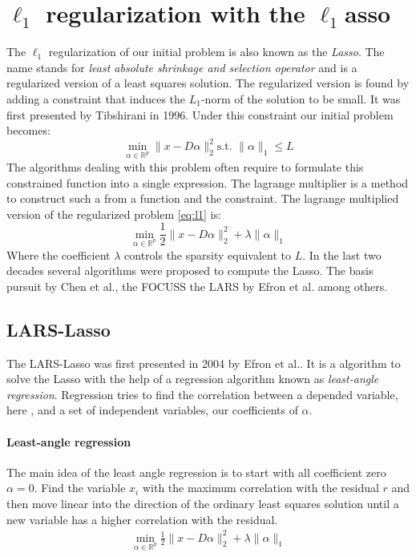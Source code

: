 \section {$\ell_1$ regularization with the $\ell_1$asso}
The $\ell_1$ regularization of our initial problem is also known as the
\emph{Lasso}. The name stands for \emph{least absolute shrinkage and
selection operator} and is a regularized version of a least squares
solution. The regularized version is found by adding a constraint that induces
the $L_1$-norm of the solution to be small. It was first presented by Tibshirani
in 1996\cite{Tibshirani1996}. Under this constraint our initial problem becomes:
\begin{equation}
\min_{\alpha\in\mathbb{R}^{p}} \lVert x - D\alpha \rVert^{2}_{2} \textrm{
s.t. } \lVert \alpha \rVert_{1} \leq L \label{eq:l1}
\end{equation}
The algorithms dealing with this problem often require to formulate this
constrained function into a single expression. The lagrange multiplier is a
method to construct such a  from a function and the constraint. The lagrange
multiplied version of the regularized problem \ref{eq:l1} is:
\begin{equation}
\min_{\alpha\in\mathbb{R}^{p}}  \frac{1}{2} \lVert x - D\alpha \rVert^{2}_{2} +
\lambda \lVert \alpha \rVert_{1}\label{eq:l1lagrange}
\end{equation}
Where the coefficient $\lambda$ controls the sparsity equivalent to $L$.
In the last two decades several algorithms were proposed to compute the
Lasso. The basis pursuit by Chen et al.\cite{Chen1995}, the FOCUSS\cite{FOCUSS}
the LARS by Efron et al.\cite{Efron2004} among others.


\subsection {LARS-Lasso}
\label{sec:lars}
The LARS-Lasso was first presented in 2004 by Efron et al.\cite{Efron2004}.
It is a algorithm to solve the Lasso with the help of a regression
algorithm known as \emph{least-angle regression}. Regression tries to find the
correlation between a depended variable, here , and a
set of independent variables, our coefficients of $\alpha$.

\paragraph{Least-angle regression}
The main idea of the least angle regression is to start with all coefficient
zero $\alpha = 0$. Find the variable $x_i$ with the maximum correlation with the
residual $r$ and then move linear into the direction of the ordinary least
squares solution until a new variable has a higher correlation with the
residual. 
\begin{align}
\min_{\alpha\in\mathbb{R}^{p}}  \frac{1}{2} \lVert x - D\alpha \rVert^{2}_{2} +
\lambda \lVert \alpha \rVert_{1}
\end{align}


